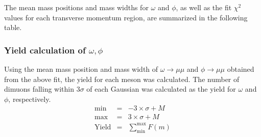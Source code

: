                 The mean mass positions and mass widths for $\omega$ and $\phi$, as well as the fit $\chi^2$ values for each transverse momentum region, are summarized in the following table.
                    \begin{table}[htbp]
                        \centering
                        \caption{Fit Results}
                        \label{Analysis:Dimuon:Yield:Fit_Results}
                    \end{table}
        \subsubsection{Yield calculation of $\omega,\phi$} 
            Using the mean mass position and mass width of $\omega \rightarrow \mu\mu$ and $\phi \rightarrow \mu\mu$ obtained from the above fit, the yield for each meson was calculated. The number of dimuons falling within 3$\sigma$ of each Gaussian was calculated as the yield for $\omega$ and $\phi$, respectively.
            \begin{eqnarray}
                \mathrm{min} &=&  -3 \times \sigma + M \\
                \mathrm{max} &=&  3 \times \sigma + M \\
                \mathrm{Yield} &=& \sum_{\mathrm{min}}^{\mathrm{max}} F(m)
            \end{eqnarray}



